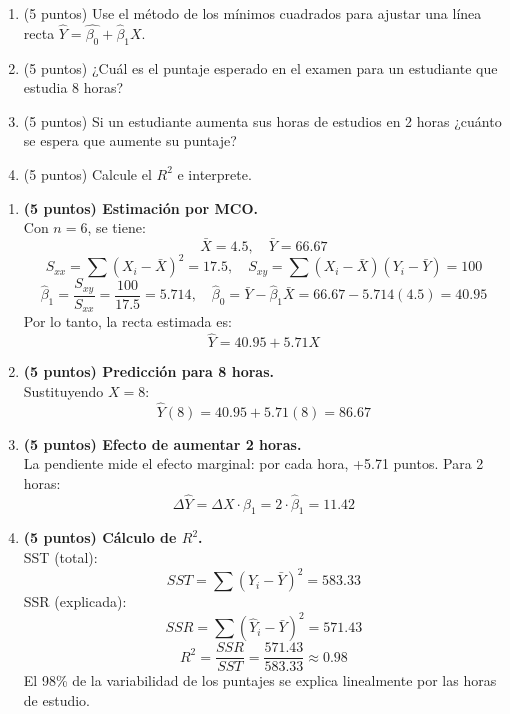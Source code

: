 \documentclass[10pt,a4paper]{article}
\begin{document}
\begin{enumerate}
\begin{enumerate}
    \item  (5 puntos) Use el método de los mínimos cuadrados para ajustar una línea recta $\hat{Y}=\hat{\beta_0}+\hat{\beta}_1X$.
   \item (5 puntos) ¿Cu\'al es el puntaje esperado en el examen para un estudiante que estudia 8 horas?
\item (5 puntos) Si un estudiante aumenta sus horas de estudios en 2 horas ¿cu\'anto se espera que aumente su puntaje?
\item (5 puntos) Calcule el $R^2$ e interprete.
\end{enumerate} 


{\color{red} 
\begin{enumerate}
    \item \textbf{(5 puntos) Estimación por MCO.} \\
    Con $n=6$, se tiene:
    \[
    \bar{X} = 4.5, \quad \bar{Y} = 66.67
    \]
    \[
    S_{xx} = \sum (X_i-\bar{X})^2 = 17.5, \quad
    S_{xy} = \sum (X_i-\bar{X})(Y_i-\bar{Y}) = 100
    \]
    \[
    \hat{\beta}_1 = \frac{S_{xy}}{S_{xx}} = \frac{100}{17.5} = 5.714, \quad
    \hat{\beta}_0 = \bar{Y} - \hat{\beta}_1\bar{X} = 66.67 - 5.714(4.5) = 40.95
    \]
    Por lo tanto, la recta estimada es:
    \[
    \widehat{Y} = 40.95 + 5.71X
    \]
   

    \item \textbf{(5 puntos) Predicción para 8 horas.} \\
    Sustituyendo $X=8$:
    \[
    \hat{Y}(8) = 40.95 + 5.71(8) = 86.67
    \]
   

    \item \textbf{(5 puntos) Efecto de aumentar 2 horas.} \\
    La pendiente mide el efecto marginal: por cada hora, +5.71 puntos. Para 2 horas:
    \[
    \Delta \hat{Y} = \Delta X \cdot \hat{\beta}_1= 2 \cdot \hat{\beta}_1 = 11.42
    \]
 

    \item \textbf{(5 puntos) Cálculo de $R^2$.} \\
    SST (total):
    \[
    SST = \sum (Y_i - \bar{Y})^2 = 583.33
    \]
    SSR (explicada):
    \[
    SSR = \sum (\hat{Y}_i - \bar{Y})^2 = 571.43
    \]
    \[
    R^2 = \frac{SSR}{SST} = \frac{571.43}{583.33} \approx 0.98
    \]
    El 98\% de la variabilidad de los puntajes se explica linealmente por las horas de estudio. 

\end{enumerate}

}


\end{enumerate} 
\end{document}
